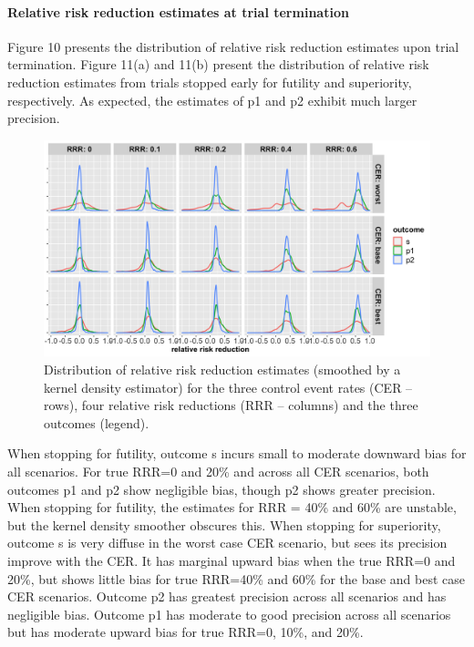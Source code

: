 \documentclass[]{article}
\let\oldparagraph\paragraph
\renewcommand{\paragraph}[1]{\oldparagraph{#1}\mbox{}}
\begin{document}
\hypertarget{relative-risk-reduction-estimates-at-trial-termination}{%
\paragraph{Relative risk reduction estimates at trial
termination}\label{relative-risk-reduction-estimates-at-trial-termination}}

Figure 10 presents the distribution of relative risk reduction estimates
upon trial termination. Figure 11(a) and 11(b) present the distribution
of relative risk reduction estimates from trials stopped early for
futility and superiority, respectively. As expected, the estimates of p1
and p2 exhibit much larger precision.

\begin{figure}
  \caption{Distribution of relative risk reduction estimates (smoothed by a kernel density estimator) for the three
  control event rates (CER – rows), four relative risk reductions (RRR – columns) and the three outcomes (legend).}
  \includegraphics{../p1_plots/batch_size_nb_1000/RRRhat_p1.png}
\end{figure}

When stopping for futility, outcome s incurs small to moderate downward
bias for all scenarios. For true RRR=0 and 20\% and across all CER
scenarios, both outcomes p1 and p2 show negligible bias, though p2 shows
greater precision. When stopping for futility, the estimates for RRR =
40\% and 60\% are unstable, but the kernel density smoother obscures
this. When stopping for superiority, outcome s is very diffuse in the
worst case CER scenario, but sees its precision improve with the CER. It
has marginal upward bias when the true RRR=0 and 20\%, but shows little
bias for true RRR=40\% and 60\% for the base and best case CER
scenarios. Outcome p2 has greatest precision across all scenarios and
has negligible bias. Outcome p1 has moderate to good precision across
all scenarios but has moderate upward bias for true RRR=0, 10\%, and
20\%.
\end{document}
